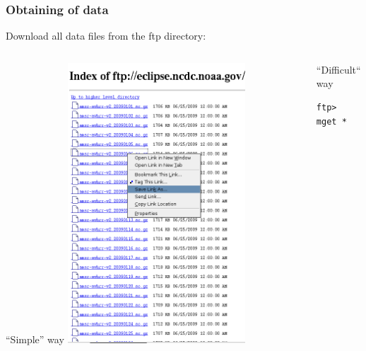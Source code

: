 \documentclass{beamer}
\begin{document}
\begin{frame}[fragile]
\frametitle{Obtaining of data} 
\begin{center}
Download all data files from the ftp directory:\\ 
\end{center}



\begin{columns}[t]
\begin{column}{.5\textwidth}
``Simple'' way
\includegraphics[width=0.6\textwidth,angle=00]{obt.png}
\vspace{3cm} 
\end{column}
\begin{column}{.5\textwidth}
``Difficult`` way
\begin{lstlisting}
ftp> mget * 
\end{lstlisting}
\end{column}
\end{columns}

\end{frame}
\end{document}
